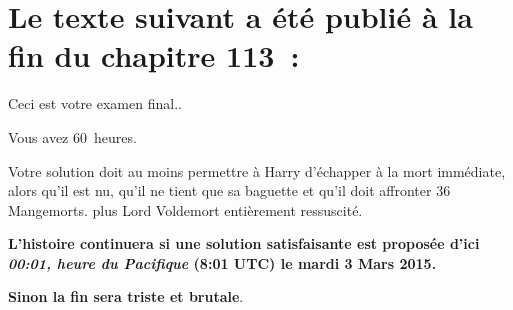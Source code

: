 \section{Le texte suivant a été publié à la fin du chapitre 113~:}


\setlength{\parskip}{.5\baselineskip}

Ceci est votre examen final..

Vous avez 60~heures.

Votre solution doit au moins permettre à Harry d'échapper à la mort immédiate,
alors qu'il est nu, qu'il ne tient que sa baguette et qu'il doit affronter 36 Mangemorts.
plus Lord Voldemort entièrement ressuscité.

\textbf{L'histoire continuera si une solution satisfaisante est proposée d'ici \emph{00:01, heure du Pacifique} (8:01 UTC) le mardi 3 Mars 2015.} 

\textbf{Sinon la fin sera triste et brutale}.

